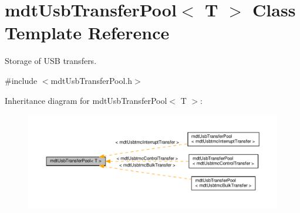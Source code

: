 \hypertarget{classmdt_usb_transfer_pool}{\section{mdt\-Usb\-Transfer\-Pool$<$ T $>$ Class Template Reference}
\label{classmdt_usb_transfer_pool}
}


Storage of U\-S\-B transfers.  




{\ttfamily \#include $<$mdt\-Usb\-Transfer\-Pool.\-h$>$}



Inheritance diagram for mdt\-Usb\-Transfer\-Pool$<$ T $>$\-:
\nopagebreak
\begin{figure}[H]
\begin{center}
\leavevmode
\includegraphics[width=350pt]{classmdt_usb_transfer_pool__inherit__graph}
\end{center}
\end{figure}
